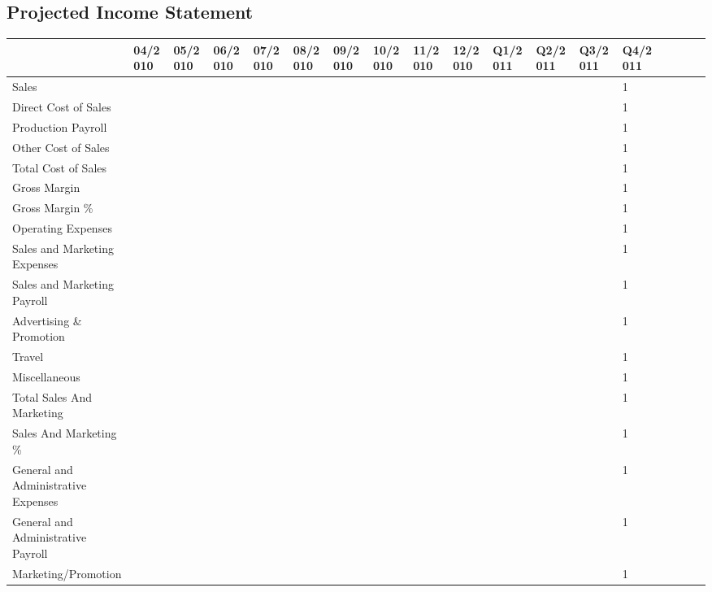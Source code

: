 \documentclass[11pt,titlepage]{article}
\begin{document}
\begin{landscape}

\subsection{Projected Income Statement}
\begin{scriptsize}
\begin{tabular}{ | l | l | l | l | l | l | l | l | l | l | l | l | l | l | l | l | l | l |}\hline
  & 04/2010 & 05/2010 & 06/2010 & 07/2010 & 08/2010 & 09/2010 & 10/2010 & 11/2010 & 12/2010 & Q1/2011 & Q2/2011 & Q3/2011 & Q4/2011\\\hline
  Sales & & & & & & & & & & & & & 1\\ \hline
  Direct Cost of Sales & & & & & & & & & & & & & 1\\\hline
  Production Payroll & & & & & & & & & & & & & 1\\\hline
  Other Cost of Sales & & & & & & & & & & & & & 1\\\hline
  Total Cost of Sales & & & & & & & & & & & & & 1\\\hline
  Gross Margin & & & & & & & & & & & & & 1\\\hline
  Gross Margin \% & & & & & & & & & & & & & 1\\\hline
  Operating Expenses & & & & & & & & & & & & & 1\\\hline
  Sales and Marketing Expenses & & & & & & & & & & & & & 1\\\hline
  Sales and Marketing Payroll & & & & & & & & & & & & & 1\\\hline
  Advertising \& Promotion & & & & & & & & & & & & & 1\\\hline
  Travel & & & & & & & & & & & & & 1\\\hline
  Miscellaneous & & & & & & & & & & & & & 1\\\hline
  Total Sales And Marketing & & & & & & & & & & & & & 1\\\hline
  Sales And Marketing \% & & & & & & & & & & & & & 1\\\hline
  General and Administrative Expenses & & & & & & & & & & & & & 1\\\hline
  General and Administrative Payroll & & & & & & & & & & & & & 1\\\hline
  Marketing/Promotion & & & & & & & & & & & & & 1\\\hline

\end{tabular}
\end{scriptsize}
\end{landscape}
\end{document}
